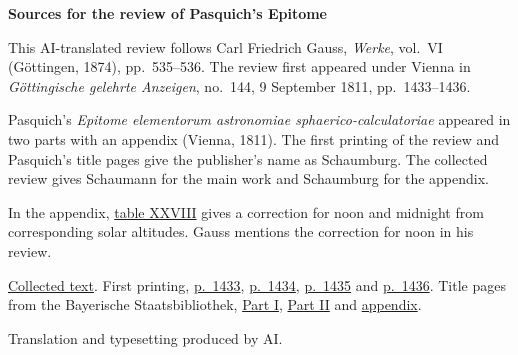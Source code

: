 \clearpage\thispagestyle{empty}
\begin{center}\textbf{Sources for the review of Pasquich's Epitome}\end{center}
\noindent This AI-translated review follows Carl Friedrich Gauss, \textit{Werke}, vol.~VI (Göttingen, 1874), pp.~535--536. The review first appeared under Vienna in \textit{Göttingische gelehrte Anzeigen}, no.~144, 9 September 1811, pp.~1433--1436.
\par\smallskip\noindent Pasquich's \textit{Epitome elementorum astronomiae sphaerico-calculatoriae} appeared in two parts with an appendix (Vienna, 1811). The first printing of the review and Pasquich's title pages give the publisher's name as Schaumburg. The collected review gives Schaumann for the main work and Schaumburg for the appendix.
\par\smallskip\noindent In the appendix, \href{https://api.digitale-sammlungen.de/iiif/image/v2/bsb10049414_00029/full/1250,/0/default.jpg}{table XXVIII} gives a correction for noon and midnight from corresponding solar altitudes. Gauss mentions the correction for noon in his review.
\par\smallskip\noindent \href{https://gdz.sub.uni-goettingen.de/id/PPN236007467}{Collected text}. First printing, \href{https://images.p.sub.uni-goettingen.de/iiif/image/gdz:PPN319721507_1811:00001467/full/1650,/0/default.jpg}{p.~1433}, \href{https://images.p.sub.uni-goettingen.de/iiif/image/gdz:PPN319721507_1811:00001468/full/1650,/0/default.jpg}{p.~1434}, \href{https://images.p.sub.uni-goettingen.de/iiif/image/gdz:PPN319721507_1811:00001469/full/1650,/0/default.jpg}{p.~1435} and \href{https://images.p.sub.uni-goettingen.de/iiif/image/gdz:PPN319721507_1811:00001470/full/1650,/0/default.jpg}{p.~1436}. Title pages from the Bayerische Staatsbibliothek, \href{https://api.digitale-sammlungen.de/iiif/image/v2/bsb10049412_00005/full/1250,/0/default.jpg}{Part I}, \href{https://api.digitale-sammlungen.de/iiif/image/v2/bsb10049413_00005/full/1250,/0/default.jpg}{Part II} and \href{https://api.digitale-sammlungen.de/iiif/image/v2/bsb10049414_00003/full/1250,/0/default.jpg}{appendix}.
\par\smallskip\noindent Translation and typesetting produced by AI.
\clearpage
